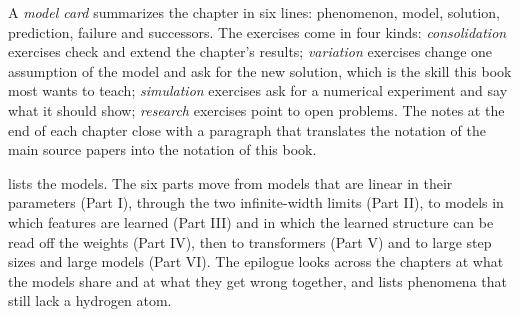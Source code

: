 \begin{refsection}
A \emph{model card} summarizes the chapter in six lines: phenomenon, model, solution, prediction, failure and successors. The exercises come in four kinds: \emph{consolidation} exercises check and extend the chapter's results; \emph{variation} exercises change one assumption of the model and ask for the new solution, which is the skill this book most wants to teach; \emph{simulation} exercises ask for a numerical experiment and say what it should show; \emph{research} exercises point to open problems. The notes at the end of each chapter close with a paragraph that translates the notation of the main source papers into the notation of this book.


 lists the models. The six parts move from models that are linear in their parameters (Part I), through the two infinite-width limits (Part II), to models in which features are learned (Part III) and in which the learned structure can be read off the weights (Part IV), then to transformers (Part V) and to large step sizes and large models (Part VI). The epilogue looks across the chapters at what the models share and at what they get wrong together, and lists phenomena that still lack a hydrogen atom.


\end{refsection}
